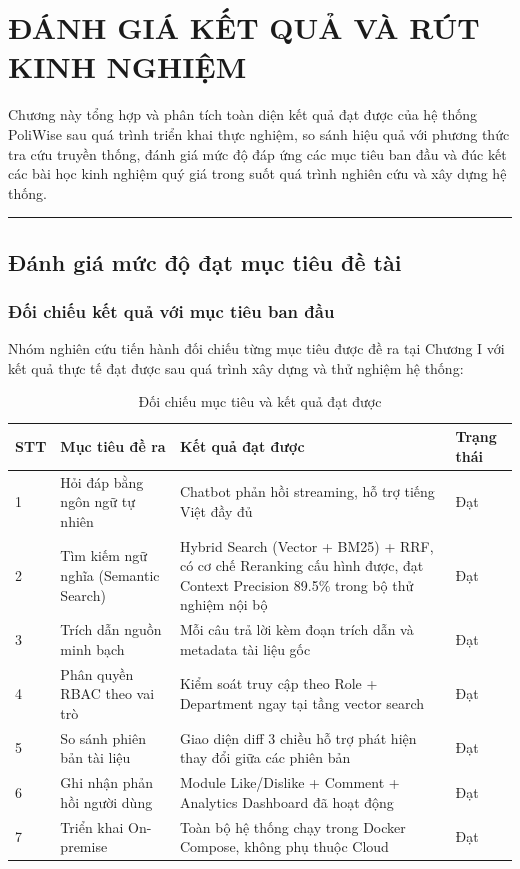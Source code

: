 \documentclass[12pt,a4paper]{report}
\begin{document}
\clearpage
\chapter{ĐÁNH GIÁ KẾT QUẢ VÀ RÚT KINH NGHIỆM}

Chương này tổng hợp và phân tích toàn diện kết quả đạt được của hệ thống PoliWise sau quá trình triển khai thực nghiệm, so sánh hiệu quả với phương thức tra cứu truyền thống, đánh giá mức độ đáp ứng các mục tiêu ban đầu và đúc kết các bài học kinh nghiệm quý giá trong suốt quá trình nghiên cứu và xây dựng hệ thống.

\rule{\textwidth}{0.5pt}

\section{Đánh giá mức độ đạt mục tiêu đề tài}

\subsection{Đối chiếu kết quả với mục tiêu ban đầu}

Nhóm nghiên cứu tiến hành đối chiếu từng mục tiêu được đề ra tại Chương I với kết quả thực tế đạt được sau quá trình xây dựng và thử nghiệm hệ thống:

\begin{table}[H]
\centering
\small
\caption{Đối chiếu mục tiêu và kết quả đạt được}
\label{tab:goal_vs_result}
\begin{tabularx}{\textwidth}{|l|X|X|l|}
\hline
\rowcolor{gray!10}
STT & Mục tiêu đề ra & Kết quả đạt được & Trạng thái \\ \hline
1 & Hỏi đáp bằng ngôn ngữ tự nhiên & Chatbot phản hồi streaming, hỗ trợ tiếng Việt đầy đủ & Đạt \\ \hline
2 & Tìm kiếm ngữ nghĩa (Semantic Search) & Hybrid Search (Vector + BM25) + RRF, có cơ chế Reranking cấu hình được, đạt Context Precision 89.5\% trong bộ thử nghiệm nội bộ & Đạt \\ \hline
3 & Trích dẫn nguồn minh bạch & Mỗi câu trả lời kèm đoạn trích dẫn và metadata tài liệu gốc & Đạt \\ \hline
4 & Phân quyền RBAC theo vai trò & Kiểm soát truy cập theo Role + Department ngay tại tầng vector search & Đạt \\ \hline
5 & So sánh phiên bản tài liệu & Giao diện diff 3 chiều hỗ trợ phát hiện thay đổi giữa các phiên bản & Đạt \\ \hline
6 & Ghi nhận phản hồi người dùng & Module Like/Dislike + Comment + Analytics Dashboard đã hoạt động & Đạt \\ \hline
7 & Triển khai On-premise & Toàn bộ hệ thống chạy trong Docker Compose, không phụ thuộc Cloud & Đạt \\ \hline
\end{tabularx}
\end{table}
\end{document}
